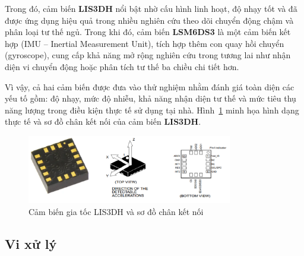 Trong đó, cảm biến \textbf{LIS3DH} nổi bật nhờ cấu hình linh hoạt, độ nhạy tốt và đã được ứng dụng hiệu quả trong nhiều nghiên cứu theo dõi chuyển động chậm và phân loại tư thế ngủ. Trong khi đó, cảm biến \textbf{LSM6DS3} là một cảm biến kết hợp (IMU – Inertial Measurement Unit), tích hợp thêm con quay hồi chuyển (gyroscope), cung cấp khả năng mở rộng nghiên cứu trong tương lai như nhận diện vi chuyển động hoặc phân tích tư thế ba chiều chi tiết hơn.

Vì vậy, cả hai cảm biến được đưa vào thử nghiệm nhằm đánh giá 
toàn diện các yếu tố gồm: độ nhạy, mức độ nhiễu, khả năng nhận diện 
tư thế và mức tiêu thụ năng lượng trong điều kiện thực tế sử 
dụng tại nhà. Hình~\ref{lis} minh họa hình dạng thực tế và sơ đồ chân kết nối của cảm biến \textbf{LIS3DH}.

\begin{figure}[htbp]
	\centering
 	\includegraphics[width=0.8\textwidth]{images/lis.png}
	\caption{Cảm biến gia tốc LIS3DH và sơ đồ chân kết nối}
	\label{lis}
\end{figure}


\subsection{Vi xử lý}

